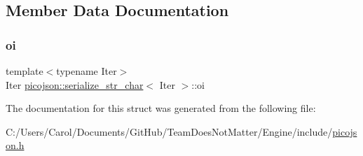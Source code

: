 \subsection{Member Data Documentation}
\hypertarget{structpicojson_1_1serialize__str__char_a1abb88801c571a903ef9e3a21388b944}{}\label{structpicojson_1_1serialize__str__char_a1abb88801c571a903ef9e3a21388b944} 
\subsubsection{\texorpdfstring{oi}{oi}}
{\footnotesize\ttfamily template$<$typename Iter$>$ \\
Iter \hyperlink{structpicojson_1_1serialize__str__char}{picojson\+::serialize\+\_\+str\+\_\+char}$<$ Iter $>$\+::oi}



The documentation for this struct was generated from the following file\+:\begin{DoxyCompactItemize}
\item 
C\+:/\+Users/\+Carol/\+Documents/\+Git\+Hub/\+Team\+Does\+Not\+Matter/\+Engine/include/\hyperlink{picojson_8h}{picojson.\+h}\end{DoxyCompactItemize}
